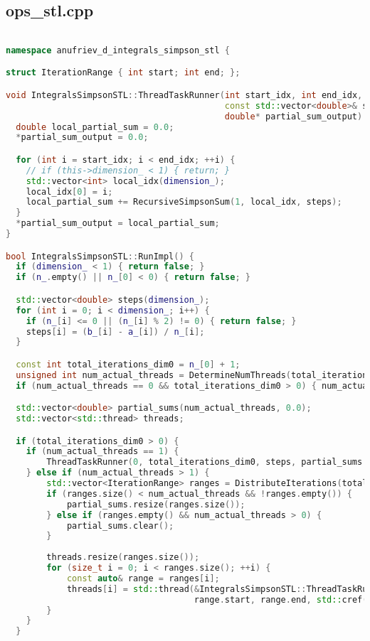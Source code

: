\documentclass[a4paper,12pt]{article}
\begin{document}
\subsection{ops\_stl.cpp}
\begin{lstlisting}[language=C++, caption=Ключевые функции из ops\_stl.cpp, basicstyle=\ttfamily\tiny]

namespace anufriev_d_integrals_simpson_stl {

struct IterationRange { int start; int end; }; 

void IntegralsSimpsonSTL::ThreadTaskRunner(int start_idx, int end_idx, 
                                           const std::vector<double>& steps,
                                           double* partial_sum_output) {
  double local_partial_sum = 0.0;
  *partial_sum_output = 0.0;

  for (int i = start_idx; i < end_idx; ++i) {
    // if (this->dimension_ < 1) { return; }
    std::vector<int> local_idx(dimension_);
    local_idx[0] = i;
    local_partial_sum += RecursiveSimpsonSum(1, local_idx, steps);
  }
  *partial_sum_output = local_partial_sum;
}

bool IntegralsSimpsonSTL::RunImpl() {
  if (dimension_ < 1) { return false; }
  if (n_.empty() || n_[0] < 0) { return false; }

  std::vector<double> steps(dimension_);
  for (int i = 0; i < dimension_; i++) {
    if (n_[i] <= 0 || (n_[i] % 2) != 0) { return false; }
    steps[i] = (b_[i] - a_[i]) / n_[i];
  }

  const int total_iterations_dim0 = n_[0] + 1;
  unsigned int num_actual_threads = DetermineNumThreads(total_iterations_dim0);
  if (num_actual_threads == 0 && total_iterations_dim0 > 0) { num_actual_threads = 1;}

  std::vector<double> partial_sums(num_actual_threads, 0.0);
  std::vector<std::thread> threads;

  if (total_iterations_dim0 > 0) {
    if (num_actual_threads == 1) {
        ThreadTaskRunner(0, total_iterations_dim0, steps, partial_sums.data());
    } else if (num_actual_threads > 1) {
        std::vector<IterationRange> ranges = DistributeIterations(total_iterations_dim0, num_actual_threads);
        if (ranges.size() < num_actual_threads && !ranges.empty()) {
            partial_sums.resize(ranges.size());
        } else if (ranges.empty() && num_actual_threads > 0) {
            partial_sums.clear(); 
        }
        
        threads.resize(ranges.size());
        for (size_t i = 0; i < ranges.size(); ++i) {
            const auto& range = ranges[i];
            threads[i] = std::thread(&IntegralsSimpsonSTL::ThreadTaskRunner, this, 
                                     range.start, range.end, std::cref(steps), &partial_sums[i]);
        }
    }
  }


\end{lstlisting}
\end{document}
